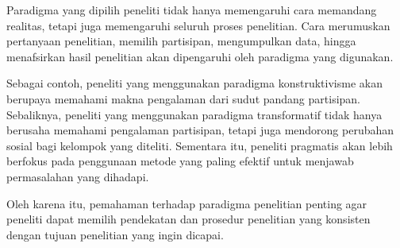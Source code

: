 \documentclass[
  indonesian,
  letterpaper,
  DIV=11,
  numbers=noendperiod]{scrreprt}
\begin{document}
Paradigma yang dipilih peneliti tidak hanya memengaruhi cara memandang
realitas, tetapi juga memengaruhi seluruh proses penelitian. Cara
merumuskan pertanyaan penelitian, memilih partisipan, mengumpulkan data,
hingga menafsirkan hasil penelitian akan dipengaruhi oleh paradigma yang
digunakan.

Sebagai contoh, peneliti yang menggunakan paradigma konstruktivisme akan
berupaya memahami makna pengalaman dari sudut pandang partisipan.
Sebaliknya, peneliti yang menggunakan paradigma transformatif tidak
hanya berusaha memahami pengalaman partisipan, tetapi juga mendorong
perubahan sosial bagi kelompok yang diteliti. Sementara itu, peneliti
pragmatis akan lebih berfokus pada penggunaan metode yang paling efektif
untuk menjawab permasalahan yang dihadapi.

Oleh karena itu, pemahaman terhadap paradigma penelitian penting agar
peneliti dapat memilih pendekatan dan prosedur penelitian yang konsisten
dengan tujuan penelitian yang ingin dicapai.
\end{document}
